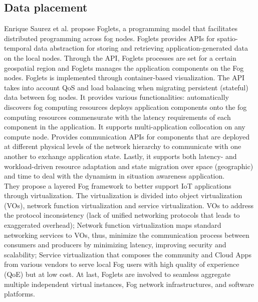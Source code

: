 \subsection{Data placement}
\label{sec:Data_placement}

\cite{saurez2016incremental}
Enrique Saurez et al. propose Foglets, a programming model that facilitates distributed programming across fog nodes. Foglets provides APIs for spatio-temporal data abstraction for storing and retrieving application-generated data on the local nodes. Through the API, Foglets processes are set for a certain geospatial region and Foglets manages the application components on the Fog nodes. Foglets is implemented through container-based visualization. The API takes into account QoS and load balancing when migrating persistent (stateful) data between fog nodes. It provides various functionalities: automatically discovers fog computing resources deploys application components onto the fog computing resources commensurate with the latency requirements of each component in the application. It supports multi-application collocation on any compute node. Provides communication APIs for components that are deployed at different physical levels of the network hierarchy to communicate with one another to exchange application state. Lastly, it supports both latency- and workload-driven resource adaptation and state migration over space (geographic) and time to deal with the dynamism in situation awareness application.\\

\cite{li2018virtual}
They propose a layered Fog framework to better support IoT applications through virtualization. The virtualization is divided into object virtualization  (VOs), network function virtualization and service virtualization. VOs to address the protocol inconsistency (lack of unified networking protocols that leads to exaggerated overhead); Network function virtualization maps standard networking services to VOs, thus, minimize the communication process between consumers and producers by minimizing latency, improving security and scalability; Service virtualization that composes the community and Cloud Apps from various vendors to serve local Fog users with high quality of experience (QoE) but at low cost. At last, Foglets are involved to seamless aggregate multiple independent virtual instances, Fog network infrastructures, and software platforms.\\

